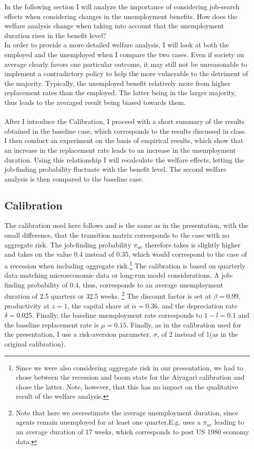 \documentclass[a4paper,12pt]{article}
\begin{document}
In the following section I will analyze the importance of considering job-search effects when considering changes in the unemployment benefits. How does the welfare analysis change when taking into account that the unemployment duration rises in the benefit level? \\
In order to provide a more detailed welfare analysis, I will look at both the employed and the unemployed when I compare the two cases. Even if society on average clearly favors one particular outcome, it may still not be unreasonable to implement a contradictory policy to help the more vulnerable to the detriment of the majority. Typically, the unemployed benefit relatively more from higher replacement rates than the employed. The latter being in the larger majority, thus leads to the averaged result being biased towards them. 
\\ \\
After I introduce the Calibration, I proceed with a short summary of the results obtained in the baseline case, which corresponds to the results discussed in class.
I then conduct an experiment on the basis of empirical results, which show that an increase in the replacement rate leads to an increase in the unemployment duration. Using this relationship I will recalculate the welfare effects, letting the job-finding probability fluctuate with the benefit level. The second welfare analysis is then compared to the baseline case. 


\subsection{Calibration}

The calibration used here follows \cite{DenHaan20101} and is the same as in the presentation, with the small difference, that the transition matrix corresponds to the case with no aggregate risk. The job-finding probability $\pi_{ue}$ therefore takes is slightly higher and takes on the value 0.4 instead of 0.35, which would correspond to the case of a recession when including aggregate risk.\footnote{Since we were also considering aggregate risk in our presentation, we had to chose between the recession and boom state for the Aiyagari calibration and chose the latter. Note, however, that this has no impact on the qualitative result of the welfare analysis.} The calibration is based on quarterly data matching microeconomic data or long-run model considerations. A job-finding probability of 0.4, thus, corresponds to an average unemployment duration of 2.5 quarters or 32.5 weeks. \footnote{Note that here we overestimate the average unemployment duration, since agents remain unemployed for at least one quarter.E.g. \cite{mukoyama} uses a $\pi_{ue}$ leading to an average duration of 17 weeks, which corresponds to post US 1980 economy data.} The discount factor is set at $\beta = 0.99$, productivity at $z = 1$, the capital share at $\alpha = 0.36$, and the depreciation rate $\delta = 0.025$. Finally, the baseline unemployment rate corresponds to  $1- l=0.1$ and the baseline replacement rate is $\mu = 0.15$. Finally, as in the calibration used for the presentation, I use a risk-aversion parameter, $\sigma$, of 2 instead of 1(as in the original calibration).
\end{document}
